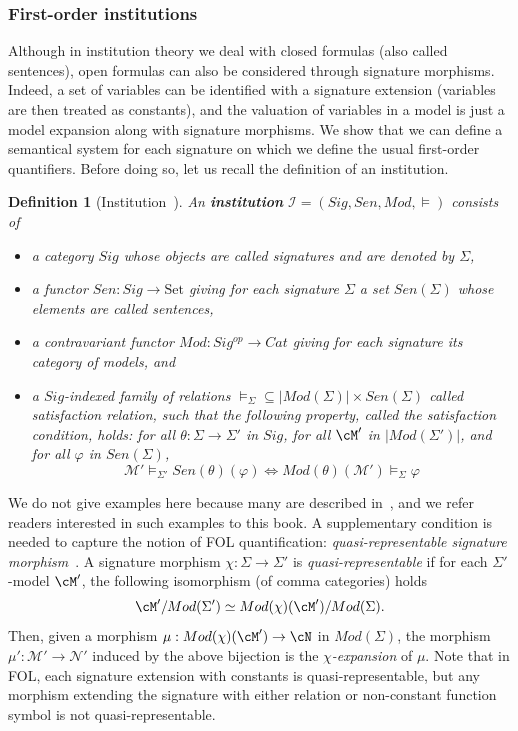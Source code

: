 \documentclass[preprint,3p,times]{elsarticle}
\newtheorem{definition}{Definition}[section]
\newcommand{\Set}{\mathrm{Set}}
\begin{document}
                    
                    
     

     

\subsubsection{First-order institutions}
\label{subsubsec:semantical system for institutions}

Although in institution theory we deal with closed formulas (also called sentences), open formulas can also be considered through signature morphisms. Indeed, a set of variables can be identified with a signature extension (variables are then treated as constants), and the valuation of variables in a model is just a model expansion along with signature morphisms.
We show that we can define a semantical system for each signature on which we define the usual first-order quantifiers. Before doing so, let us recall the definition of an institution.
\begin{definition}[Institution~\cite{GB92}]
An {\bf institution} $\mathcal{I} = (Sig,Sen,Mod,\models)$ consists of
\begin{itemize}
\item a category $Sig$ whose objects are called {\em signatures} and are denoted by $\Sigma$,
\item a functor $Sen : Sig \rightarrow \Set$ giving for each signature $\Sigma$ a set $Sen(\Sigma)$ whose elements are called {\em sentences}, 
\item a contravariant functor $Mod : Sig^{op} \rightarrow Cat$ giving for each signature its category of models, and 
\item a $Sig$-indexed family of relations $\models_\Sigma \subseteq |Mod(\Sigma)| \times Sen(\Sigma)$ called 
{\em satisfaction relation}, such that the following property, called the {\em satisfaction condition}, holds: for all $\theta : \Sigma \rightarrow \Sigma'$ in $Sig$, for all $\cM'$ in 
$|Mod(\Sigma')|$, and for all $\varphi$ in $Sen(\Sigma)$,
\[
    \mathcal{M}' \models_{\Sigma'} Sen(\theta)(\varphi) \Longleftrightarrow Mod(\theta)(\mathcal{M}') \models_\Sigma \varphi
\]
\end{itemize}
\end{definition}

We do not give examples here because many are described in~\cite{Dia08}, and we refer readers interested in such examples to this book.  
A supplementary condition is needed to capture the notion of FOL quantification: {\em quasi-representable signature morphism}~\cite[Chap. 5, p. 102]{Dia08}. A signature morphism $\chi : \Sigma \to \Sigma'$ is {\em quasi-representable} if for each $\Sigma'$-model $\cM'$,
the following isomorphism (of comma categories) holds
\[
    \cM'/Mod(\Sigma') \simeq Mod(\chi)(\cM')/Mod(\Sigma).
\]
Then, given a morphism $\mu : Mod(\chi)(\cM') \to \cN$ in \(Mod(\Sigma)\), the morphism $\mu' : \mathcal{M}' \to \mathcal{N}'$ induced by the above bijection is the {\em $\chi$-expansion} of \(\mu\).
Note that in FOL, each signature extension with constants is quasi-representable, but any morphism extending the signature with either relation or non-constant function symbol is not quasi-representable.
\end{document}
